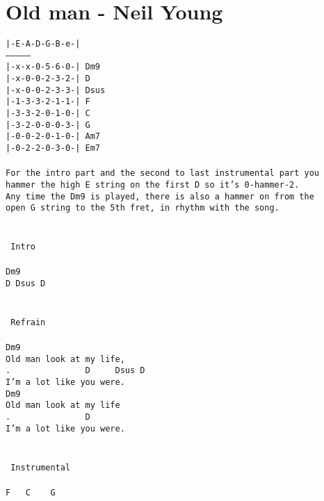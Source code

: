 \newpage
\section{Old man - Neil Young}
\label{Old man - Neil Young}
\texttt{|-E-A-D-G-B-e-|\\
---------------\\
|-x-x-0-5-6-0-|\ Dm9\\
|-x-0-0-2-3-2-|\ D\\
|-x-0-0-2-3-3-|\ Dsus\\
|-1-3-3-2-1-1-|\ F\\
|-3-3-2-0-1-0-|\ C\\
|-3-2-0-0-0-3-|\ G\\
|-0-0-2-0-1-0-|\ Am7\\
|-0-2-2-0-3-0-|\ Em7\\
\\
For\ the\ intro\ part\ and\ the\ second\ to\ last\ instrumental\ part\ you\\
hammer\ the\ high\ E\ string\ on\ the\ first\ D\ so\ it's\ 0-hammer-2.\\
Any\ time\ the\ Dm9\ is\ played,\ there\ is\ also\ a\ hammer\ on\ from\ the\\
open\ G\ string\ to\ the\ 5th\ fret,\ in\ rhythm\ with\ the\ song.\\
\\
\\
\lbrack\ Intro\rbrack\\
\\
Dm9\\
D\ Dsus\ D\\
\\
\\
\lbrack\ Refrain\rbrack\\
\\
Dm9\\
Old\ man\ look\ at\ my\ life,\\
. \ \ \ \ \ \ \ \ \ \ \ \ \ \ D\ \ \ \ \ Dsus\ D\\
I'm\ a\ lot\ like\ you\ were.\\
Dm9\\
Old\ man\ look\ at\ my\ life\\
. \ \ \ \ \ \ \ \ \ \ \ \ \ \ D\\
I'm\ a\ lot\ like\ you\ were.\\
\\
\\
\lbrack\ Instrumental\rbrack\\
\\
F\ \ \ C\ \ \ \ G\\
}
